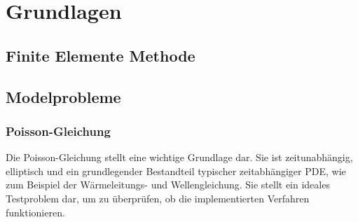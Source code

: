 \documentclass[crop=false]{standalone}
\begin{document}
  \section{Grundlagen} %
  \label{sec:background}


    \subsection{Finite Elemente Methode} %
    \label{sub:finite_elemente_methode}


    \subsection{Modelprobleme} %
    \label{sub:modelprobleme}
      \newcommand{\domain}{\ensuremath{\Omega}}
      \newcommand{\boundary}{\ensuremath{\partial\domain}}
      \newcommand{\neumannBoundary}{\ensuremath{\boundary_\mathrm{N}}}
      \newcommand{\dirichletBoundary}{\ensuremath{\boundary_\mathrm{D}}}

      \subsubsection{Poisson-Gleichung} %
      \label{ssub:poisson_gleichung}
        Die Poisson-Gleichung stellt eine wichtige Grundlage dar.
        Sie ist zeitunabhängig, elliptisch und ein grundlegender Bestandteil typischer zeitabhängiger PDE, wie zum Beispiel der Wärmeleitungs- und Wellengleichung.
        Sie stellt ein ideales Testproblem dar, um zu überprüfen, ob die implementierten Verfahren funktionieren.
\end{document}
